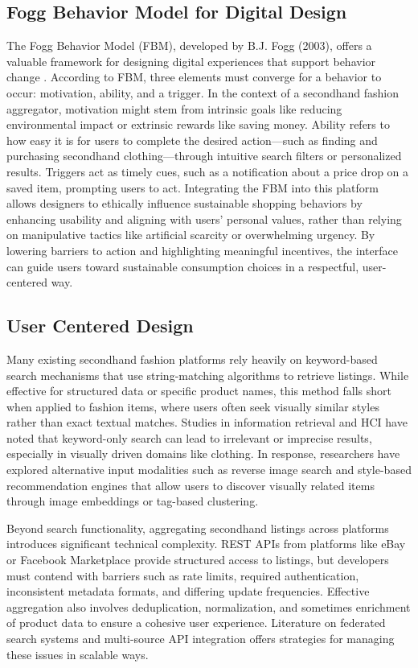 \documentclass[10pt,twocolumn]{article}
\begin{document}
\subsection{Fogg Behavior Model for Digital Design}
The Fogg Behavior Model (FBM), developed by B.J. Fogg (2003), offers a valuable framework for designing digital experiences that support behavior change \cite{fogg2003}. According to FBM, three elements must converge for a behavior to occur: motivation, ability, and a trigger. In the context of a secondhand fashion aggregator, motivation might stem from intrinsic goals like reducing environmental impact or extrinsic rewards like saving money. Ability refers to how easy it is for users to complete the desired action—such as finding and purchasing secondhand clothing—through intuitive search filters or personalized results. Triggers act as timely cues, such as a notification about a price drop on a saved item, prompting users to act. Integrating the FBM into this platform allows designers to ethically influence sustainable shopping behaviors by enhancing usability and aligning with users’ personal values, rather than relying on manipulative tactics like artificial scarcity or overwhelming urgency. By lowering barriers to action and highlighting meaningful incentives, the interface can guide users toward sustainable consumption choices in a respectful, user-centered way.
\subsection{User Centered Design}
Many existing secondhand fashion platforms rely heavily on keyword-based search mechanisms that use string-matching algorithms to retrieve listings. While effective for structured data or specific product names, this method falls short when applied to fashion items, where users often seek visually similar styles rather than exact textual matches. Studies in information retrieval and HCI have noted that keyword-only search can lead to irrelevant or imprecise results, especially in visually driven domains like clothing. In response, researchers have explored alternative input modalities such as reverse image search and style-based recommendation engines that allow users to discover visually related items through image embeddings or tag-based clustering.

Beyond search functionality, aggregating secondhand listings across platforms introduces significant technical complexity. REST APIs from platforms like eBay or Facebook Marketplace provide structured access to listings, but developers must contend with barriers such as rate limits, required authentication, inconsistent metadata formats, and differing update frequencies. Effective aggregation also involves deduplication, normalization, and sometimes enrichment of product data to ensure a cohesive user experience. Literature on federated search systems and multi-source API integration offers strategies for managing these issues in scalable ways.
\end{document}
